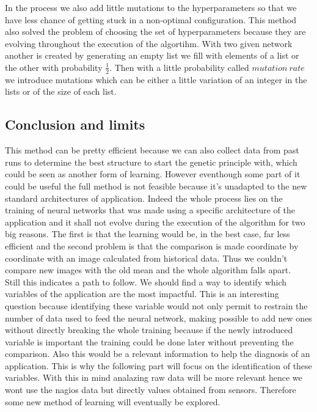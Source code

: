 \documentclass[10pt,a4paper,oneside]{article}
\begin{document}
\begin{multicols}{2}
In the process we also add little mutations to the hyperparameters so that we have less chance of getting stuck in a non-optimal configuration. This method also solved the problem of choosing the set of hyperparameters because they are evolving throughout the execution of the algortihm.
With two given network another is created by generating an empty list we fill with elements of a list or the other with probability $\frac{1}{2}$. Then with a little probability called $mutation ~rate$ we introduce mutations which can be either a little variation of an integer in the lists or of the size of each list.

\subsection{Conclusion and limits}
This method can be pretty efficient because we can also collect data from past runs to determine the best structure to start the genetic principle with, which could be seen as another form of learning. However eventhough some part of it could be useful the full method is not feasible because it's unadapted to the new standard architectures of application. Indeed the whole process lies on the training of neural networks that was made using a specific architecture of the application and it shall not evolve during the execution of the algorithm for two big reasons. The first is that the learning would be, in the best case, far less efficient and the second problem is that the comparison is made coordinate by coordinate with an image calculated from historical data. Thus we couldn't compare new images with the old mean and the whole algorithm falls apart.
\\ Still this indicates a path to follow. We should find a way to identify which variables of the application are the most impactful. This is an interesting question because identifying these variable would not only permit to restrain the number of data used to feed the neural network, making possible to add new ones without directly breaking the whole training because if the newly introduced variable is important the training could be done later without preventing the comparison. Also this would be a relevant information to help the diagnosis of an application. This is why the following part will focus on the identification of these variables. With this in mind analazing raw data will be more relevant hence we wont use the nagios data but directly values obtained from sensors. Therefore some new method of learning will eventually be explored.


\end{multicols}
\end{document}
